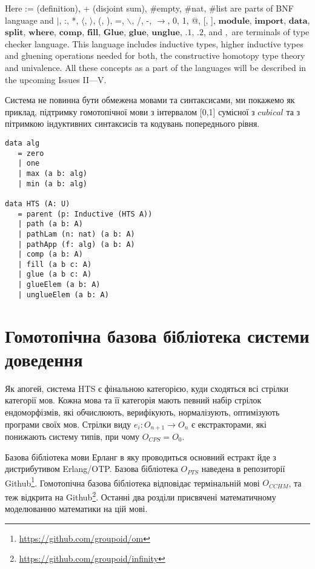 Here := (definition), + (disjoint sum), \#empty, \#nat, \#list are parts of BNF language and
$\rvert$, :, *, $\langle$, $\rangle$, (, ), =, $\backslash$, /, -, $\rightarrow$, 0, 1, @, [, ],
$\mathbf{module}$, $\mathbf{import}$,
$\mathbf{data}$, $\mathbf{split}$, $\mathbf{where}$, $\mathbf{comp}$, $\mathbf{fill}$,
$\mathbf{Glue}$, $\mathbf{glue}$, $\mathbf{unglue}$,
$\mathbf{.1}$, $\mathbf{.2}$,
 and $,$ are terminals of type checker language. This language includes
inductive types, higher inductive types and gluening operations needed for
both, the constructive homotopy type theory and univalence. All these concepts as a part of the languages
will be described in the upcoming Issues II---V.

Система не повинна бути обмежена мовами та синтаксисами, ми покажемо як приклад,
підтримку гомотопічної мови з інтервалом [0,1] сумісної з $cubical$ та з пітримкою індуктивних
синтаксисів та кодувань попереднього рівня.

\begin{lstlisting}[mathescape=true]
data alg
   = zero
   | one
   | max (a b: alg)
   | min (a b: alg)

data HTS (A: U)
   = parent (p: Inductive (HTS A))
   | path (a b: A)
   | pathLam (n: nat) (a b: A)
   | pathApp (f: alg) (a b: A)
   | comp (a b: A)
   | fill (a b c: A)
   | glue (a b c: A)
   | glueElem (a b: A)
   | unglueElem (a b: A)
\end{lstlisting}

\section{Гомотопічна базова бібліотека системи доведення}

Як апогей, система HTS є фінальною категорією,
куди сходяться всі стрілки категорії мов. Кожна мова та її категорія
мають певний набір стрілок ендоморфізмів, які обчислюють, верифікують,
нормалізують, оптимізують програми своїх мов.
Стрілки виду $e_i: O_{n+1} \rightarrow O_n$ є екстракторами, які понижають систему типів,
при чому $O_{CPS} = O_0$.

Базова бібліотека мови Ерланг в яку проводиться основний
естракт йде з дистрибутивом Erlang/OTP. Базова бібліотека
$O_{PTS}$ наведена в репозиторії Github\footnote{\url{https://github.com/groupoid/om}}.
Гомотопічна базова бібліотека відповідає термінальній мові $O_{CCHM}$, та теж відкрита
на Github\footnote{\url{https://github.com/groupoid/infinity}}.
Останні два розділи присвячені математичному моделюванню математики на цій мові.

